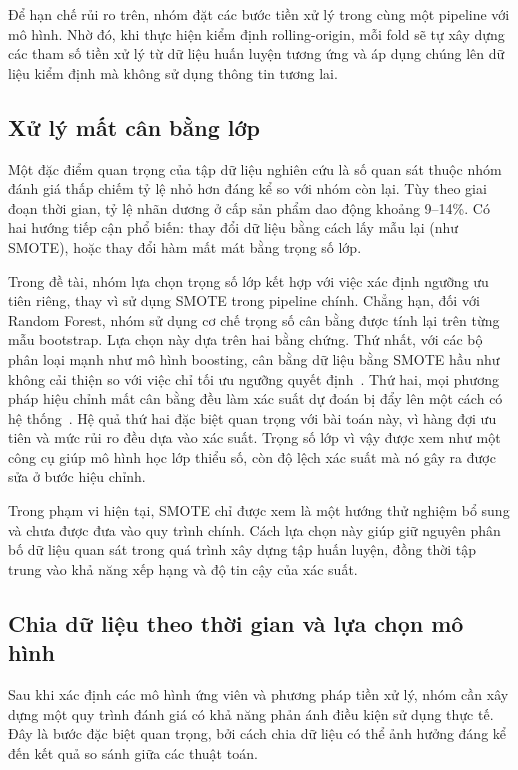 \documentclass[12pt,a4paper]{report}
\begin{document}
Để hạn chế rủi ro trên, nhóm đặt các bước tiền xử lý trong cùng một pipeline với mô hình. Nhờ đó, khi thực hiện kiểm định rolling-origin, mỗi fold sẽ tự xây dựng các tham số tiền xử lý từ dữ liệu huấn luyện tương ứng và áp dụng chúng lên dữ liệu kiểm định mà không sử dụng thông tin tương lai.

\subsection{Xử lý mất cân bằng lớp}

Một đặc điểm quan trọng của tập dữ liệu nghiên cứu là số quan sát thuộc nhóm đánh giá thấp chiếm tỷ lệ nhỏ hơn đáng kể so với nhóm còn lại. Tùy theo giai đoạn thời gian, tỷ lệ nhãn dương ở cấp sản phẩm dao động khoảng 9--14\%. Có hai hướng tiếp cận phổ biến: thay đổi dữ liệu bằng cách lấy mẫu lại (như SMOTE), hoặc thay đổi hàm mất mát bằng trọng số lớp. 

Trong đề tài, nhóm lựa chọn trọng số lớp kết hợp với việc xác định ngưỡng ưu tiên riêng, thay vì sử dụng SMOTE trong pipeline chính. Chẳng hạn, đối với Random Forest, nhóm sử dụng cơ chế trọng số cân bằng được tính lại trên từng mẫu bootstrap. Lựa chọn này dựa trên hai bằng chứng. Thứ nhất, với các bộ phân loại mạnh như mô hình boosting, cân bằng dữ liệu bằng SMOTE hầu như không cải thiện so với việc chỉ tối ưu ngưỡng quyết định~\cite{elor2022smote}. Thứ hai, mọi phương pháp hiệu chỉnh mất cân bằng đều làm xác suất dự đoán bị đẩy lên một cách có hệ thống~\cite{vandengoorbergh2022}. Hệ quả thứ hai đặc biệt quan trọng với bài toán này, vì hàng đợi ưu tiên và mức rủi ro đều dựa vào xác suất. Trọng số lớp vì vậy được xem như một công cụ giúp mô hình học lớp thiểu số, còn độ lệch xác suất mà nó gây ra được sửa ở bước hiệu chỉnh. 

Trong phạm vi hiện tại, SMOTE chỉ được xem là một hướng thử nghiệm bổ sung và chưa được đưa vào quy trình chính. Cách lựa chọn này giúp giữ nguyên phân bố dữ liệu quan sát trong quá trình xây dựng tập huấn luyện, đồng thời tập trung vào khả năng xếp hạng và độ tin cậy của xác suất.

\subsection{Chia dữ liệu theo thời gian và lựa chọn mô hình}

Sau khi xác định các mô hình ứng viên và phương pháp tiền xử lý, nhóm cần xây dựng một quy trình đánh giá có khả năng phản ánh điều kiện sử dụng thực tế. Đây là bước đặc biệt quan trọng, bởi cách chia dữ liệu có thể ảnh hưởng đáng kể đến kết quả so sánh giữa các thuật toán.
\end{document}
